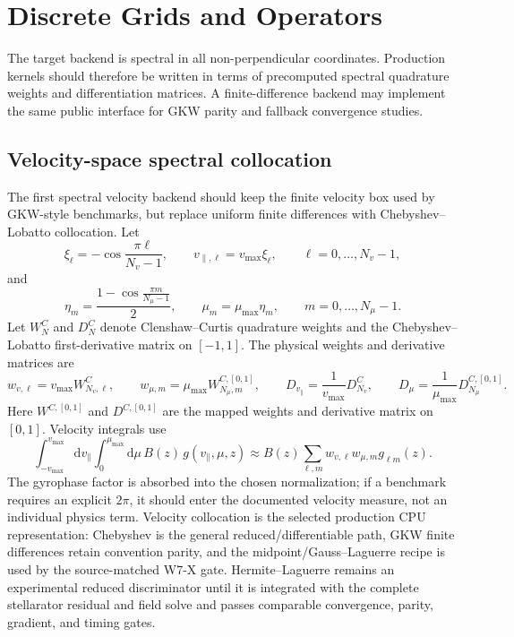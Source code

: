 \documentclass[11pt,a4paper]{article}
\newcommand{\dd}{\mathrm{d}}
\newcommand{\vpar}{v_{\parallel}}
\begin{document}
\section{Discrete Grids and Operators}

The target backend is spectral in all non-perpendicular coordinates.  Production kernels should therefore be written in terms of precomputed spectral quadrature weights and differentiation matrices.  A finite-difference backend may implement the same public interface for GKW parity and fallback convergence studies.

\subsection{Velocity-space spectral collocation}

The first spectral velocity backend should keep the finite velocity box used by GKW-style benchmarks, but replace uniform finite differences with Chebyshev--Lobatto collocation.  Let
\begin{equation}
  \xi_\ell = -\cos\frac{\pi\ell}{N_v-1},
  \qquad
  v_{\parallel,\ell}=v_{\max}\xi_\ell,
  \qquad
  \ell=0,\ldots,N_v-1,
  \label{eq:vpar-cheb-grid}
\end{equation}
and
\begin{equation}
  \eta_m=\frac{1-\cos\frac{\pi m}{N_\mu-1}}{2},
  \qquad
  \mu_m=\mu_{\max}\eta_m,
  \qquad
  m=0,\ldots,N_\mu-1.
  \label{eq:mu-cheb-grid}
\end{equation}
Let \(W^C_N\) and \(D^C_N\) denote Clenshaw--Curtis quadrature weights and the Chebyshev--Lobatto first-derivative matrix on \([-1,1]\).  The physical weights and derivative matrices are
\begin{equation}
  w_{v,\ell}=v_{\max} W^C_{N_v,\ell},
  \qquad
  w_{\mu,m}=\mu_{\max} W^{C,[0,1]}_{N_\mu,m},
  \qquad
  D_{v_\parallel}=\frac{1}{v_{\max}}D^C_{N_v},
  \qquad
  D_\mu=\frac{1}{\mu_{\max}}D^{C,[0,1]}_{N_\mu}.
  \label{eq:velocity-spectral-ops}
\end{equation}
Here \(W^{C,[0,1]}\) and \(D^{C,[0,1]}\) are the mapped weights and derivative matrix on \([0,1]\).  Velocity integrals use
\begin{equation}
  \int_{-v_{\max}}^{v_{\max}}\dd\vpar
  \int_0^{\mu_{\max}}\dd\mu\,
  B(z)\,g(\vpar,\mu,z)
  \approx
  B(z)
  \sum_{\ell,m} w_{v,\ell}w_{\mu,m}
  g_{\ell m}(z).
  \label{eq:velocity-spectral-quadrature}
\end{equation}
The gyrophase factor is absorbed into the chosen normalization; if a benchmark requires an explicit \(2\pi\), it should enter the documented velocity measure, not an individual physics term.  Velocity collocation is the selected production CPU representation: Chebyshev is the general reduced/differentiable path, GKW finite differences retain convention parity, and the midpoint/Gauss--Laguerre recipe is used by the source-matched W7-X gate.  Hermite--Laguerre remains an experimental reduced discriminator until it is integrated with the complete stellarator residual and field solve and passes comparable convergence, parity, gradient, and timing gates.
\end{document}
